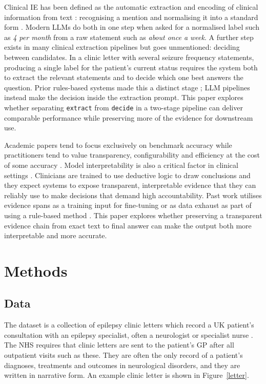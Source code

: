 \documentclass[conference]{IEEEtran}
\begin{document}
Clinical IE has been defined as the automatic extraction 
and encoding of clinical information from text \cite{b13}: 
recognising a mention and normalising it into a standard 
form \cite{b14}. Modern LLMs do both in one step when asked 
for a normalised label such as \emph{4 per month} from a raw 
statement such as \emph{about once a week}. A further step 
exists in many clinical extraction pipelines but goes 
unmentioned: deciding between candidates. In a clinic letter 
with several seizure frequency statements, producing a single 
label for the patient's current status requires the system 
both to extract the relevant statements and to decide which 
one best answers the question. Prior rules-based systems made 
this a distinct stage \cite{b15}; LLM pipelines instead make the 
decision inside the extraction prompt. This paper explores 
whether separating \texttt{extract} from \texttt{decide} in a 
two-stage pipeline can deliver comparable performance while 
preserving more of the evidence for downstream use.

Academic papers tend to focus exclusively on benchmark 
accuracy while practitioners tend to value transparency, 
configurability and efficiency at the cost of some accuracy \cite{b15, b16}. 
Model interpretability is also a critical factor in clinical settings \cite{b14}. 
Clinicians are trained to use deductive logic to draw 
conclusions and they expect systems to expose transparent, 
interpretable evidence that they can reliably use to make 
decisions that demand high accountability. Past work 
utilises evidence spans as a training input \cite{b3} for 
fine-tuning or as data exhaust as part of using a rule-based 
method \cite{b7}. This paper explores whether preserving a 
transparent evidence chain from exact text to final answer 
can make the output both more interpretable and more 
accurate.

\section{Methods}
\subsection{Data}
\label{sec:data}

The dataset is a collection of epilepsy clinic letters which 
record a UK patient's consultation with an epilepsy 
specialist, often a neurologist or specialist nurse \cite{b3}. 
The NHS requires that clinic letters are sent to the 
patient's GP after all outpatient visits such as these.
They are often the only record of a patient's diagnoses,
treatments and outcomes in neurological disorders, 
and they are written in narrative form. An example clinic letter 
is shown in Figure~\ref{letter}.
\end{document}
